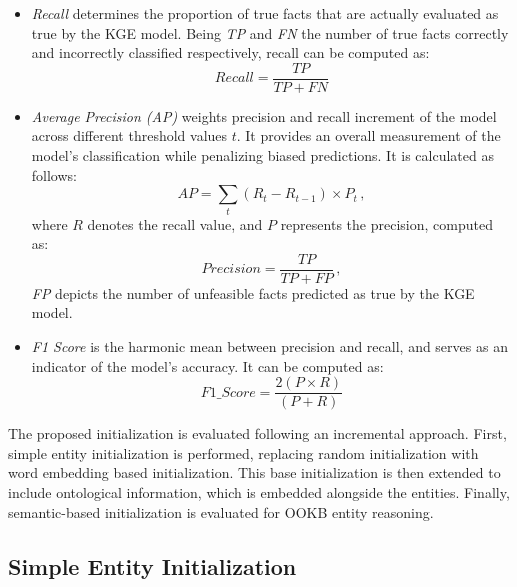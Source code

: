 \begin{itemize}
    \item \textit{Recall} determines the proportion of true facts that are actually evaluated as true by the KGE model. Being \textit{TP} and \textit{FN} the number of true facts correctly and incorrectly classified respectively, recall can be computed as:
    \begin{equation}
        Recall = \frac{TP}{TP+FN}
    \end{equation}
    
    \item \textit{Average Precision (AP)} weights precision and recall increment of the model across different threshold values $t$. It provides an overall measurement of the model's classification while penalizing biased predictions. It is calculated as follows:
    \begin{equation}
        AP = \sum_{t} (R_t - R_{t-1}) \times P_t \,,
    \end{equation}
    where $R$ denotes the recall value, and $P$ represents the precision, computed as:
    \begin{equation}
        Precision = \frac{TP}{TP+FP} \,,
    \end{equation}
    \textit{FP} depicts the number of unfeasible facts predicted as true by the KGE model.
    
    \item \textit{F1 Score} is the harmonic mean between precision and recall, and serves as an indicator of the model's accuracy. It can be computed as:
    \begin{equation}
        F1\_Score = \frac{2 (P \times R)}{(P + R)}
    \end{equation}
\end{itemize}

The proposed initialization is evaluated following an incremental approach. First, simple entity initialization is performed, replacing random initialization with word embedding based initialization. This base initialization is then extended to include ontological information, which is embedded alongside the entities. Finally, semantic-based initialization is evaluated for OOKB entity reasoning.

\subsection{Simple Entity Initialization}

